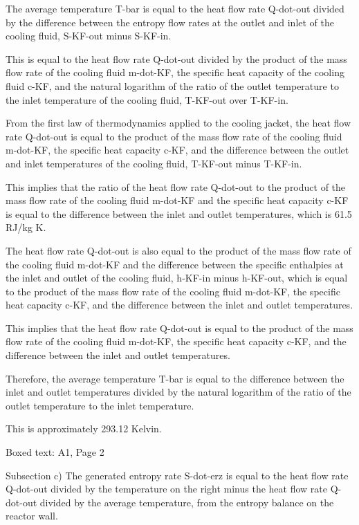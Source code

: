 The average temperature T-bar is equal to the heat flow rate Q-dot-out divided by the difference between the entropy flow rates at the outlet and inlet of the cooling fluid, S-KF-out minus S-KF-in.

This is equal to the heat flow rate Q-dot-out divided by the product of the mass flow rate of the cooling fluid m-dot-KF, the specific heat capacity of the cooling fluid c-KF, and the natural logarithm of the ratio of the outlet temperature to the inlet temperature of the cooling fluid, T-KF-out over T-KF-in.

From the first law of thermodynamics applied to the cooling jacket, the heat flow rate Q-dot-out is equal to the product of the mass flow rate of the cooling fluid m-dot-KF, the specific heat capacity c-KF, and the difference between the outlet and inlet temperatures of the cooling fluid, T-KF-out minus T-KF-in.

This implies that the ratio of the heat flow rate Q-dot-out to the product of the mass flow rate of the cooling fluid m-dot-KF and the specific heat capacity c-KF is equal to the difference between the inlet and outlet temperatures, which is 61.5 RJ/kg K.

The heat flow rate Q-dot-out is also equal to the product of the mass flow rate of the cooling fluid m-dot-KF and the difference between the specific enthalpies at the inlet and outlet of the cooling fluid, h-KF-in minus h-KF-out, which is equal to the product of the mass flow rate of the cooling fluid m-dot-KF, the specific heat capacity c-KF, and the difference between the inlet and outlet temperatures.

This implies that the heat flow rate Q-dot-out is equal to the product of the mass flow rate of the cooling fluid m-dot-KF, the specific heat capacity c-KF, and the difference between the inlet and outlet temperatures.

Therefore, the average temperature T-bar is equal to the difference between the inlet and outlet temperatures divided by the natural logarithm of the ratio of the outlet temperature to the inlet temperature.

This is approximately 293.12 Kelvin.

Boxed text: A1, Page 2

Subsection c) The generated entropy rate S-dot-erz is equal to the heat flow rate Q-dot-out divided by the temperature on the right minus the heat flow rate Q-dot-out divided by the average temperature, from the entropy balance on the reactor wall.

